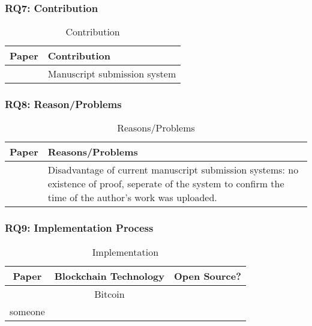 \clearpage
\subsubsection{RQ7: Contribution}

\begin{longtable}{ |c|p{6cm}| }
	\caption{Contribution} \\
	\hline
 	\textbf{Paper} & \textbf{Contribution} \\ [0.5ex] 
 	\hline\hline
 	\endhead
 	\cite{2017_Gipp} & Manuscript submission system\\
	\hline
\end{longtable}

\clearpage
\subsubsection{RQ8: Reason/Problems}

\begin{longtable}{ |c|p{6cm}| }
	\caption{Reasons/Problems}
	\label{tab:rq8_reason_problem}\\
	\hline
 	\textbf{Paper} & \textbf{Reasons/Problems} \\ [0.5ex] 
 	\hline\hline
 	\endhead
 	\cite{2017_Gipp} & Disadvantage of current manuscript submission systems: no existence of proof, seperate of the system to confirm the time of the author's work was uploaded.\\
	\hline
\end{longtable}

\clearpage
\subsubsection{RQ9: Implementation Process}

\begin{longtable}{ |c|c|c| }
	\caption{Implementation}
	\label{tab:rq9_implementation_process}\\
	\hline
 	\textbf{Paper} & Blockchain Technology & \textbf{Open Source?} \\ [0.5ex] 
 	\hline\hline
 	\endhead
 	\cite{2017_Gipp} & Bitcoin & \cmark \\
	\hline
	someone & \xmark \\
	\hline
\end{longtable}

